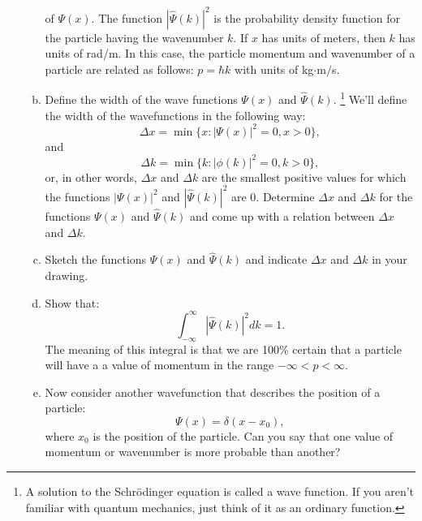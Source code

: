 \begin{enumerate}
\begin{enumerate}[a)]
{} of $\Psi(x)$. The function $|\hat{\Psi}(k)|^{2}$ is the probability
density function for the particle having the wavenumber $k$. If $x$
has units of meters, then $k$ has units of rad/m. In this case, the
particle momentum and wavenumber of a particle are related as follows:
$p = \hbar k$ with units of kg$\cdot$m$/$s.

\item Define the width of the wave functions $\Psi(x)$ and $\hat{\Psi}(k)$.
\footnote{A solution to the Schrödinger equation is called a wave function. If you aren't familiar with quantum mechanics, just think of it as an ordinary function.} We'll define the width of the wavefunctions in the following way:
$$\Delta x = \min\{x : |\Psi(x)|^{2}=0,x>0\},$$
and 
$$\Delta k = \min\{k : |\phi(k)|^{2}=0,k>0\},$$
or, in other words, $\Delta x$ and $\Delta k$ are the smallest positive values for which the functions $|\Psi(x)|^{2}$ and $|\hat{\Psi}(k)|^{2}$ are $0$. Determine $\Delta x$ and $\Delta k$ for the functions $\Psi(x)$ and $\hat{\Psi}(k)$ and come up with a relation between $\Delta x$ and $\Delta k$.

\item Sketch the functions $\Psi(x)$ and $\hat{\Psi}(k)$ and indicate $\Delta x$ and $\Delta k$ in your drawing. 

\item Show that:
$$\int_{-\infty}^{\infty} |\hat{\Psi}(k)|^{2}dk=1.$$ The meaning of this
integral is that we are 100\% certain that a particle will have a
a value of momentum in the range $-\infty<p<\infty$.

\item Now consider another wavefunction that describes the position of a particle:
\begin{equation}
\Psi(x) = \delta(x-x_0),
\end{equation}
where $x_0$ is the position of the particle. Can you say that one
value of momentum or wavenumber is more probable than another?

\end{enumerate}



\end{enumerate}
